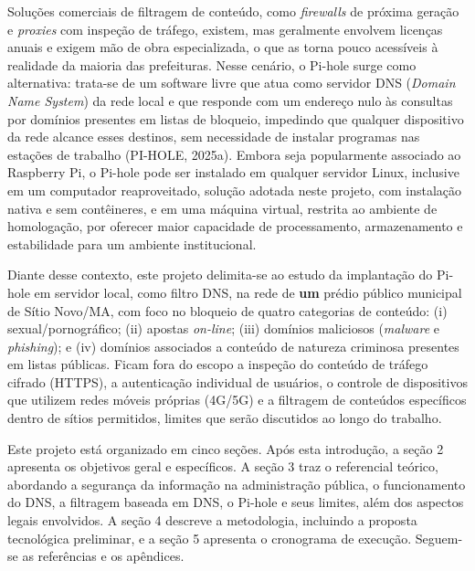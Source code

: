 \documentclass[12pt,a4paper]{article}
\begin{document}
Soluções comerciais de filtragem de conteúdo, como \textit{firewalls} de próxima geração e \textit{proxies} com inspeção de tráfego, existem, mas geralmente envolvem licenças anuais e exigem mão de obra especializada, o que as torna pouco acessíveis à realidade da maioria das prefeituras. Nesse cenário, o Pi-hole surge como alternativa: trata-se de um software livre que atua como servidor DNS (\textit{Domain Name System}) da rede local e que responde com um endereço nulo às consultas por domínios presentes em listas de bloqueio, impedindo que qualquer dispositivo da rede alcance esses destinos, sem necessidade de instalar programas nas estações de trabalho (PI-HOLE, 2025a). Embora seja popularmente associado ao Raspberry Pi, o Pi-hole pode ser instalado em qualquer servidor Linux, inclusive em um computador reaproveitado, solução adotada neste projeto, com instalação nativa e sem contêineres, e em uma máquina virtual, restrita ao ambiente de homologação, por oferecer maior capacidade de processamento, armazenamento e estabilidade para um ambiente institucional.

Diante desse contexto, este projeto delimita-se ao estudo da implantação do Pi-hole em servidor local, como filtro DNS, na rede de \textbf{um} prédio público municipal de Sítio Novo/MA, com foco no bloqueio de quatro categorias de conteúdo: (i) sexual/pornográfico; (ii) apostas \textit{on-line}; (iii) domínios maliciosos (\textit{malware} e \textit{phishing}); e (iv) domínios associados a conteúdo de natureza criminosa presentes em listas públicas. Ficam fora do escopo a inspeção do conteúdo de tráfego cifrado (HTTPS), a autenticação individual de usuários, o controle de dispositivos que utilizem redes móveis próprias (4G/5G) e a filtragem de conteúdos específicos dentro de sítios permitidos, limites que serão discutidos ao longo do trabalho.

Este projeto está organizado em cinco seções. Após esta introdução, a seção 2 apresenta os objetivos geral e específicos. A seção 3 traz o referencial teórico, abordando a segurança da informação na administração pública, o funcionamento do DNS, a filtragem baseada em DNS, o Pi-hole e seus limites, além dos aspectos legais envolvidos. A seção 4 descreve a metodologia, incluindo a proposta tecnológica preliminar, e a seção 5 apresenta o cronograma de execução. Seguem-se as referências e os apêndices.
\end{document}
